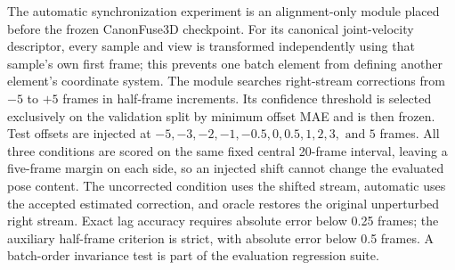 The automatic synchronization experiment is an alignment-only module placed before the frozen CanonFuse3D checkpoint. For its canonical joint-velocity descriptor, every sample and view is transformed independently using that sample's own first frame; this prevents one batch element from defining another element's coordinate system. The module searches right-stream corrections from \(-5\) to \(+5\) frames in half-frame increments. Its confidence threshold is selected exclusively on the validation split by minimum offset MAE and is then frozen. Test offsets are injected at \(-5,-3,-2,-1,-0.5,0,0.5,1,2,3,\text{ and }5\) frames. All three conditions are scored on the same fixed central 20-frame interval, leaving a five-frame margin on each side, so an injected shift cannot change the evaluated pose content. The uncorrected condition uses the shifted stream, automatic uses the accepted estimated correction, and oracle restores the original unperturbed right stream. Exact lag accuracy requires absolute error below 0.25 frames; the auxiliary half-frame criterion is strict, with absolute error below 0.5 frames. A batch-order invariance test is part of the evaluation regression suite.
